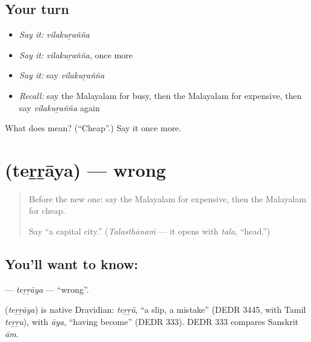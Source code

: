 \subsection*{Your turn}
\begin{itemize}
\raggedright
  \item \emph{Say it:} \emph{vilakuṟañña}
  \item \emph{Say it:} \emph{vilakuṟañña}, once more
  \item \emph{Say it:} say \emph{vilakuṟañña}
  \item \emph{Recall:} say the Malayalam for busy, then the Malayalam for expensive, then say \emph{vilakuṟañña} again
\end{itemize}

\begin{tcolorbox}[breakable,colback=teal!4,colframe=teal!35!black,title={Before you move on}]
What does  mean? (\textquotedblleft{}Cheap\textquotedblright{}.) Say it once more.
\end{tcolorbox}
\section[\texorpdfstring{\ml{തെറ്റായ} (teṟṟāya)}{തെറ്റായ (teṟṟāya)}]{ (teṟṟāya) — wrong}

\label{lesson:ML-C170-terraya}



\begin{quote}
Before the new one: say the Malayalam for expensive, then the Malayalam for cheap.

Say \textquotedblleft{}a capital city.\textquotedblright{} (\emph{Talasthānaṁ} — it opens with \emph{tala}, \textquotedblleft{}head.\textquotedblright{})
\end{quote}

\subsection*{You'll want to know: }
\textbf{} — \emph{teṟṟāya} — \textquotedblleft{}wrong\textquotedblright{}.

\begin{cousinweb}
\textbf{} (\emph{teṟṟāya}) is native Dravidian: \emph{teṟṟŭ}, \textquotedblleft{}a slip, a mistake\textquotedblright{} (DEDR 3445, with Tamil \emph{teṟṟu}), with \emph{āya}, \textquotedblleft{}having become\textquotedblright{} (DEDR 333). DEDR 333 compares Sanskrit \emph{ām}.
\end{cousinweb}


